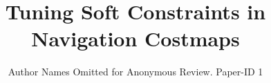 \documentclass[conference]{IEEEtran}
\newcommand{\PAPERTITLE}{Tuning Soft Constraints in Navigation Costmaps}
\begin{document}
\title{\PAPERTITLE}

\author{Author Names Omitted for Anonymous Review. Paper-ID 1}


\maketitle

\begin{abstract}

\end{abstract}

\IEEEpeerreviewmaketitle







%







\end{document}
